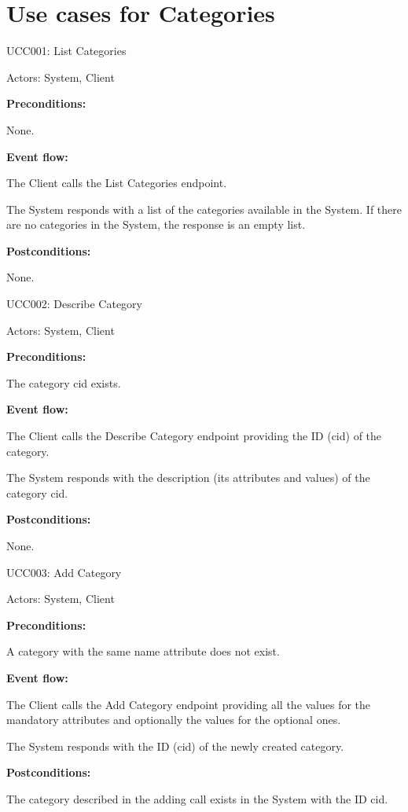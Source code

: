 \section{Use cases for Categories}

\begin{ucbox}{UCC001: List Categories}
\label{UCC001}

Actors: System, Client

\textbf{Preconditions:}

\ucitem None.

\textbf{Event flow:}

\ucitem The Client calls the List Categories endpoint.

\ucitem The System responds with a list of the categories available in the System. If there are no categories in the System, the response is an empty list.

\textbf{Postconditions:}

\ucitem None.

\end{ucbox}

\begin{ucbox}{UCC002: Describe Category}
\label{UCC002}

Actors: System, Client

\textbf{Preconditions:}

\ucitem The category cid exists.

\textbf{Event flow:}

\ucitem The Client calls the Describe Category endpoint providing the ID (cid) of the category.

\ucitem The System responds with the description (its attributes and values) of the category cid.

\textbf{Postconditions:}

\ucitem None.

\end{ucbox}

\begin{ucbox}{UCC003: Add Category}
\label{UCC003}

Actors: System, Client

\textbf{Preconditions:}

\ucitem A category with the same name attribute does not exist.

\textbf{Event flow:}

\ucitem The Client calls the Add Category endpoint providing all the values for the mandatory attributes and optionally the values for the optional ones.

\ucitem The System responds with the ID (cid) of the newly created category.

\textbf{Postconditions:}

\ucitem The category described in the adding call exists in the System with the ID cid.

\end{ucbox}

